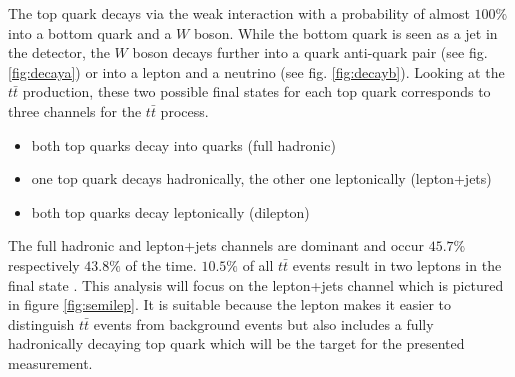 	The top quark decays via the weak interaction with a probability of almost $100\%$ into a bottom quark and a $W$ boson. While the bottom quark is seen as a jet in the detector, the $W$ boson decays further into a quark anti-quark pair (see fig. \ref{fig:decaya}) or into a lepton and a neutrino (see fig. \ref{fig:decayb}). Looking at the $t\bar{t}$ production, these two possible final states for each top quark corresponds to three channels for the $t\bar{t}$ process. 
	\begin{itemize}
	\item both top quarks decay into quarks (full hadronic)
	\item one top quark decays hadronically, the other one leptonically (lepton+jets)
	\item both top quarks decay leptonically (dilepton)
	\end{itemize}
	The full hadronic and lepton+jets channels are dominant and occur $45.7\%$ respectively $43.8\%$ of the time. $10.5\%$ of all $t\bar{t}$ events result in two leptons in the final state \cite{pdg2016}. This analysis will focus on the lepton+jets channel which is pictured in figure \ref{fig:semilep}. It is suitable because the lepton makes it easier to distinguish $t\bar{t}$ events from background events but also includes a fully hadronically decaying top quark which will be the target for the presented measurement.
	
		

